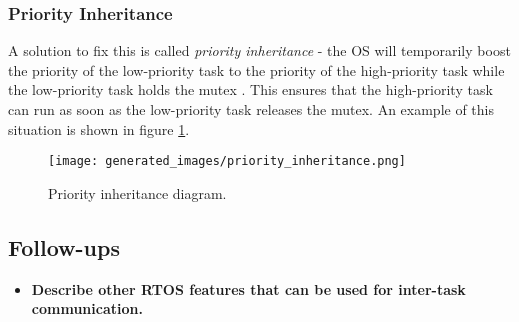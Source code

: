 \documentclass[main.tex]{subfiles}
\begin{document}
\subsubsection{Priority Inheritance}
A solution to fix this is called \textit{priority inheritance} - the OS will temporarily boost the priority of the low-priority task to the priority of the high-priority task while the low-priority task holds the mutex \cite{digikey_priority_inversion}. This ensures that the high-priority task can run as soon as the low-priority task releases the mutex. An example of this situation is shown in figure \ref{fig:priority_inheritance}.

\begin{figure}[H]
    \centering
    \texttt{[image: generated\_images/priority\_inheritance.png]}
    \caption{Priority inheritance diagram.}
    \label{fig:priority_inheritance}
\end{figure}

\subsection{Follow-ups}
\begin{itemize}
    \item \textbf{Describe other RTOS features that can be used for inter-task communication.}
\end{itemize}
\end{document}
